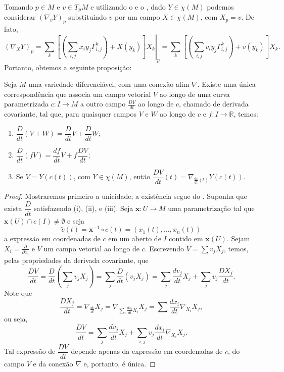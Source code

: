 Tomando $p \in M$ e $v \in T_{p}M$ e utilizando o  e o , dado $Y \in \chi(M)$ podemos considerar $(\nabla_{v}Y)_{p}$ substituindo $v$ por um campo $X \in \chi(M)$, com $X_{p}=v$. De fato,
\begin{equation*}
	(\nabla_{X}Y)_{p} = \left.\sum_{k}\left[\left( \sum_{i,j}x_{i}y_{j}\Gamma_{i,j}^{k} \right)+X(y_{k})\right]X_{k}\right|_{p} = \sum_{k}\left[\left( \sum_{i,j}v_{i}y_{j}\Gamma_{i,j}^{k} \right)+v(y_{k})\right]X_{k}.
\end{equation*}
Portanto, obtemos a seguinte proposição:
\begin{proposition}
	\label{prop:derivada-covariante}
	Seja $M$ uma variedade diferenciável, com uma conexão afim $\nabla$. Existe uma única correspondência que associa um campo vetorial $V$ ao longo de uma curva parametrizada $c:I\to M$ a outro campo $\frac{DV}{dt}$ ao longo de $c$, chamado de derivada covariante, tal que, para quaisquer campos $V$ e $W$ ao longo de $c$ e $f:I\to \mathbb{R}$, temos:
	\begin{enumerate}[label=(\roman*)]
		\item $\dfrac{D}{dt}(V+W)= \dfrac{D}{dt}V +\dfrac{D}{dt}W$;
		\item $\dfrac{D}{dt}(fV)=\dfrac{df}{dt}V+f\dfrac{DV}{dt}$;
		\item Se $V = Y(c(t))$, com $Y \in \chi(M)$, então $\dfrac{DV}{dt}(t)=\nabla_{\frac{dc}{dt}(t)}Y(c(t))$.
	\end{enumerate}
	\begin{proof}

		Mostraremos primeiro a unicidade; a existência segue do .
		Suponha que exista $\dfrac{D}{dt}$ satisfazendo (i), (ii), e (iii). Seja $\mathbf{x}:U\to M$ uma parametrização tal que $\mathbf{x}(U)\cap c(I)\neq \emptyset$ e seja
		\begin{equation*}
			\tilde{c}(t)=\mathbf{x}^{-1} \circ c(t)=(x_{1}(t), \dots, x_{n}(t))
		\end{equation*}
		a expressão em coordenadas de $c$ em um aberto de $I$ contido em $\mathbf{x}(U)$.
		Sejam $X_{i}=\frac{\partial}{\partial x_{i}}$ e $V$ um campo vetorial ao longo de $c$.
		Escrevendo $V=\sum v_{j}X_{j}$, temos, pelas propriedades da derivada covariante, que
		\begin{equation*}
			\frac{DV}{dt}=\frac{D}{dt}\left( \sum_{j}v_{j}X_{j} \right)=\sum_{j}\frac{D}{dt}(v_{j}X_{j})=\sum_{j}\frac{dv_{j}}{dt}X_{j}+ \sum_{j}v_{j}\frac{DX_{j}}{dt}.
		\end{equation*}
		Note que
		\begin{equation*}
			\frac{DX_{j}}{dt}=\nabla_{\frac{dc}{dt}}X_{j}=\nabla_{\sum_{i}\frac{dx_{i}}{dt}X_{i}}X_{j}=\sum\frac{dx_{i}}{dt}\nabla_{X_{i}}X_{j},
		\end{equation*}
		ou seja,
		\begin{equation}
			\label{eq:derivada-covariante-coordenadas}
			\frac{DV}{dt}=\sum_{j}\frac{dv_{j}}{dt}X_{j}+\sum_{i,j}v_{j}\frac{dx_{i}}{dt}\nabla_{X_{i}}X_{j}.
		\end{equation}
		Tal expressão de $\dfrac{DV}{dt}$ depende apenas da expressão em coordenadas de $c$, do campo $V$ e da conexão $\nabla$ e, portanto, é única.


\end{proof}
\end{proposition}
